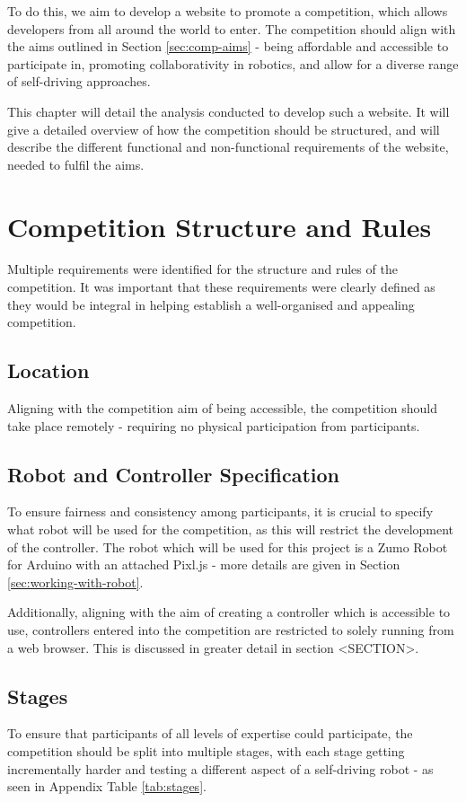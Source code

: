 \documentclass{l4proj}
\begin{document}
To do this, we aim to develop a website to promote a competition, which allows developers from all around the world to enter. The competition should align with the aims outlined in Section \ref{sec:comp-aims} - being affordable and accessible to participate in, promoting collaborativity in robotics, and allow for a diverse range of self-driving approaches.

This chapter will detail the analysis conducted to develop such a website. It will give a detailed overview of how the competition should be structured, and will describe the different functional and non-functional requirements of the website, needed to fulfil the aims.


\section{Competition Structure and Rules}
Multiple requirements were identified for the structure and rules of the competition. It was important that these requirements were clearly defined as they would be integral in helping establish a well-organised and appealing competition.

\subsection{Location}
Aligning with the competition aim of being accessible, the competition should take place remotely - requiring no physical participation from participants.

\subsection{Robot and Controller Specification}\label{sec:robot-specification}
To ensure fairness and consistency among participants, it is crucial to specify what robot will be used for the competition, as this will restrict the development of the controller. The robot which will be used for this project is a Zumo Robot for Arduino with an attached Pixl.js - more details are given in Section \ref{sec:working-with-robot}.

Additionally, aligning with the aim of creating a controller which is accessible to use, controllers entered into the competition are restricted to solely running from a web browser. This is discussed in greater detail in section <SECTION>.

\subsection{Stages}
To ensure that participants of all levels of expertise could participate, the competition should be split into multiple stages, with each stage getting incrementally harder and testing a different aspect of a self-driving robot - as seen in Appendix Table \ref{tab:stages}.
\end{document}
